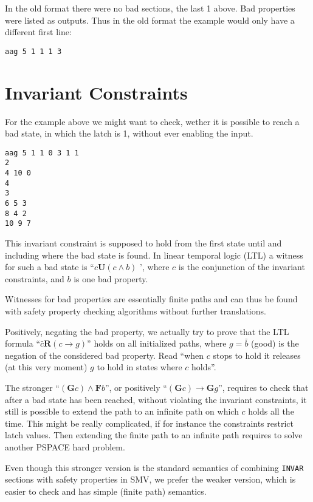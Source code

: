 \documentclass{llncs}
\begin{document}
In the old format there were no bad sections, the last 1 above.  Bad
properties were listed as outputs.  Thus in the old format the example would
only have a different first line:
{\small
\begin{verbatim}
aag 5 1 1 1 3
\end{verbatim}}

\section{Invariant Constraints}

For the example above we might want to check, wether it is possible to reach
a bad state, in which the latch is 1, without ever enabling the input.
{\small
\begin{verbatim}
aag 5 1 1 0 3 1 1
2
4 10 0
4
3
6 5 3
8 4 2
10 9 7
\end{verbatim}}
This invariant constraint is supposed to hold from the first state
until and including where the bad state is found.  In linear temporal logic
(LTL) a witness for such a bad state is 
``$ \mathit{c} \mathrel{\mathbf{U}} (c \wedge b) $ ',
where $c$ is the conjunction of the invariant constraints, and $b$ is
one bad property.  

Witnesses for bad properties are essentially finite paths
and can thus be found with safety property checking algorithms without
further translations.

Positively, negating the bad property, we actually try to prove that the LTL
formula ``$ \mathit{\bar c} \mathrel{\mathbf{R}} (c \to g) $'' holds on
all initialized paths, where $g = \bar b$ (good) is the negation of the
considered bad property.  Read ``when $c$ stops to hold it releases
(at this very moment) $g$ to hold in states where $c$ holds''.

The stronger ``$(\mathrel{\mathbf{G}} c) \wedge \mathrel{\mathbf{F}}b$'',
or positively ``$(\mathrel{\mathbf{G}} c) \to \mathrel{\mathbf{G}}g$'',
requires to check that after a bad state has been
reached, without violating the invariant constraints, it still is possible
to extend the path to an infinite path on which $c$ holds all the time.
This might be really complicated, if for instance the constraints restrict
latch values.  Then extending the finite path to an infinite path requires
to solve another PSPACE hard problem.

Even though this stronger version is the standard semantics of combining
\texttt{INVAR} sections with safety properties in SMV, we prefer the weaker
version, which is easier to check and has simple (finite path) semantics.
\end{document}
